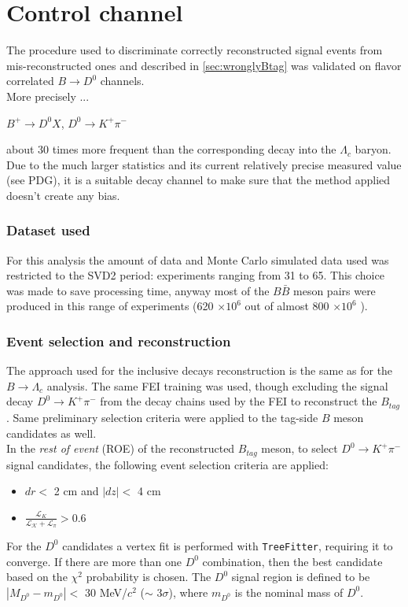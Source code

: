 \chapter{Control channel}

The procedure used to discriminate correctly reconstructed signal events from mis-reconstructed ones and described in \ref{sec:wronglyBtag} 
was validated on flavor correlated $B \rightarrow D^0 $ channels.\\
More precisely ...\\
\begin{center}
    $B^+ \rightarrow D^0 X$, $D^0 \rightarrow K^+ \pi^-$ 
   \end{center}
   about 30 times more frequent than the corresponding decay into the $\Lambda_c$ baryon. 
   Due to the much larger statistics and its current relatively precise measured value (see PDG), it is a suitable decay channel to make sure that the method applied doesn't create any bias.


\subsection{Dataset used}

   For this analysis the amount of data and Monte Carlo simulated data used was restricted to the SVD2 period: 
   experiments ranging from 31 to 65. This choice was made to save processing time, anyway most of the $B\bar{B}$ meson pairs were produced in this range of experiments (620 $\times 10^6$ out of almost 800 $\times 10^6$ ).
   
   \subsection{Event selection and reconstruction}
   
   The approach used for the inclusive decays reconstruction is the same as for the $B \rightarrow \Lambda_c$ analysis. The same FEI training was used, though excluding the signal decay $D^0 \rightarrow K^+ \pi^-$ from the decay chains used by the FEI to reconstruct the $B_{tag}$.
   Same preliminary selection criteria were applied to the tag-side $B$ meson candidates as well. \\
   \noindent In the \textit{rest of event} (ROE) of the reconstructed $B_{tag}$ meson, to select $D^0 \rightarrow K^+ \pi^-$ signal candidates, the following event selection criteria are applied:
   \begin{itemize}
   \item $dr <$ 2 cm and $|dz| <$ 4 cm
   \item $\frac{\mathcal{L}_{K}}{\mathcal{L_{K}}+\mathcal{L_{\pi}}} > 0.6$
   \end{itemize}
   For the $D^0 $ candidates a vertex fit is performed with \texttt{TreeFitter}, requiring it to converge.  If there are more than one $D^0$ combination, then the best candidate based on the $\chi^2$ probability is chosen. The $D^0$ signal region is defined to be $|M_{D^0}  - m_{D^0}| < $   30  MeV/$c^2$ 
   \newline \noindent ($\sim$ 3$\sigma$), where $m_{D^0 }$ is the nominal mass of $D^0$.\\

